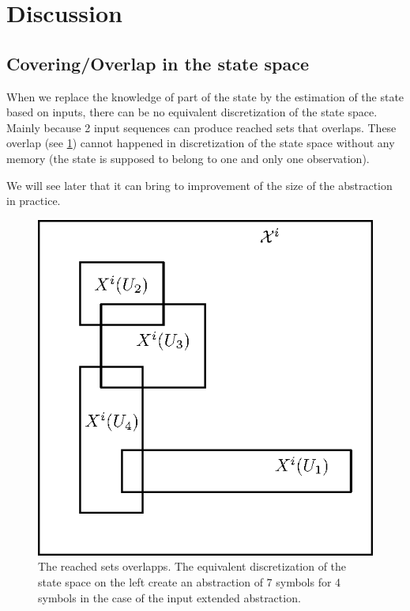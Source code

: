 \section{Discussion}
%

\subsection{Covering/Overlap in the state space}
When we replace the knowledge of part of the state by the estimation of the state based on inputs, there can be no equivalent discretization of the state space.
Mainly because 2 input sequences can produce reached sets that overlaps.
These overlap (see \ref{fig:overlapp}) cannot happened in discretization of the state space without any memory (the state is supposed to belong to one and only one observation).

We will see later that it can bring to improvement of the size of the abstraction in practice.

\begin{figure}
\centering
\begin{minipage}[b]{0.49\textwidth}
	\includegraphics[width=\textwidth]{chapters/abstraction_reduction/overlapp_disc.eps}
\end{minipage}
\caption{The reached sets overlapps. The equivalent discretization of the state space on the left create an abstraction of 7 symbols for 4 symbols in the case of the input extended abstraction.}
\label{fig:overlapp}
\end{figure}


